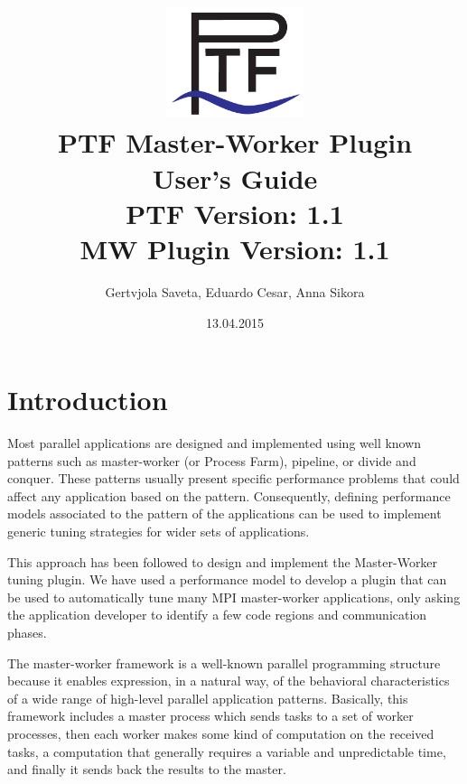 \documentclass[11pt,a4paper, oneside]{book} %
\begin{document}
\title{\includegraphics[width=4cm]{../images/Ptf_LogoBlau}\\ \vspace{1cm}
\textsf{\bf \huge PTF Master-Worker Plugin\\ User's Guide }\\
       \normalsize PTF Version: 1.1\\
       MW Plugin Version: 1.1}
\author{Gertvjola Saveta, Eduardo Cesar, Anna Sikora}
\date{13.04.2015}

\maketitle
\tableofcontents

\chapter{Introduction}

Most parallel applications are designed and implemented using well known patterns such as master-worker (or Process Farm), pipeline, or divide and conquer. These patterns usually present specific performance problems that could affect any application based on the pattern. Consequently, defining performance models associated to the pattern of the applications can be used to implement generic tuning strategies for wider sets of applications.

This approach has been followed to design and implement the Master-Worker tuning plugin. We have used a performance model to develop a plugin that can be used to automatically tune many MPI  master-worker applications, only asking the application developer to identify a few code regions and communication phases.

The master-worker framework is a well-known parallel programming structure because it enables expression, in a natural way, of the behavioral characteristics of a wide range of high-level parallel application patterns. Basically, this framework includes a master process which sends tasks to a set of worker processes, then each worker makes some kind of computation on the received tasks, a computation that generally requires a variable and unpredictable time, and finally it sends back the results to the master.
\end{document}
